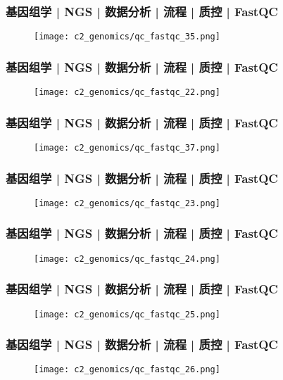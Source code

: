 \begin{frame}
  \frametitle{基因组学 | NGS | 数据分析 | 流程 | 质控 | FastQC}
  \begin{figure}
    \centering
    \texttt{[image: c2\_genomics/qc\_fastqc\_35.png]}
  \end{figure}
\end{frame}

\begin{frame}
  \frametitle{基因组学 | NGS | 数据分析 | 流程 | 质控 | FastQC}
  \begin{figure}
    \centering
    \texttt{[image: c2\_genomics/qc\_fastqc\_22.png]}
  \end{figure}
\end{frame}

\begin{frame}
  \frametitle{基因组学 | NGS | 数据分析 | 流程 | 质控 | FastQC}
  \begin{figure}
    \centering
    \texttt{[image: c2\_genomics/qc\_fastqc\_37.png]}
  \end{figure}
\end{frame}

\begin{frame}
  \frametitle{基因组学 | NGS | 数据分析 | 流程 | 质控 | FastQC}
  \begin{figure}
    \centering
    \texttt{[image: c2\_genomics/qc\_fastqc\_23.png]}
  \end{figure}
\end{frame}

\begin{frame}
  \frametitle{基因组学 | NGS | 数据分析 | 流程 | 质控 | FastQC}
  \begin{figure}
    \centering
    \texttt{[image: c2\_genomics/qc\_fastqc\_24.png]}
  \end{figure}
\end{frame}

\begin{frame}
  \frametitle{基因组学 | NGS | 数据分析 | 流程 | 质控 | FastQC}
  \begin{figure}
    \centering
    \texttt{[image: c2\_genomics/qc\_fastqc\_25.png]}
  \end{figure}
\end{frame}

\begin{frame}
  \frametitle{基因组学 | NGS | 数据分析 | 流程 | 质控 | FastQC}
  \begin{figure}
    \centering
    \texttt{[image: c2\_genomics/qc\_fastqc\_26.png]}
  \end{figure}
\end{frame}

